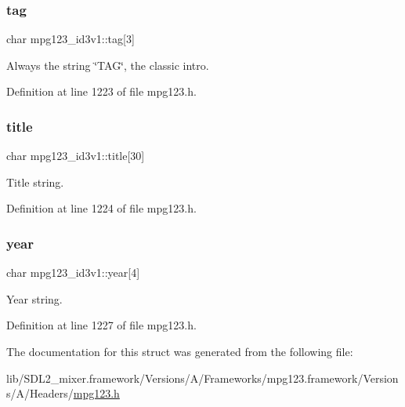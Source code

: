\subsubsection{\texorpdfstring{tag}{tag}}
{\footnotesize\ttfamily char mpg123\+\_\+id3v1\+::tag\mbox{[}3\mbox{]}}

Always the string \char`\"{}\+T\+A\+G\char`\"{}, the classic intro. 

Definition at line 1223 of file mpg123.\+h.

\mbox{\label{structmpg123__id3v1_a07f4a232c9be375fc35285538ff08c98}} 
\subsubsection{\texorpdfstring{title}{title}}
{\footnotesize\ttfamily char mpg123\+\_\+id3v1\+::title\mbox{[}30\mbox{]}}

Title string. 

Definition at line 1224 of file mpg123.\+h.

\mbox{\label{structmpg123__id3v1_a6087be9b3b25b86cafb4d59af51a1c67}} 
\subsubsection{\texorpdfstring{year}{year}}
{\footnotesize\ttfamily char mpg123\+\_\+id3v1\+::year\mbox{[}4\mbox{]}}

Year string. 

Definition at line 1227 of file mpg123.\+h.



The documentation for this struct was generated from the following file\+:\begin{DoxyCompactItemize}
\item 
lib/\+S\+D\+L2\+\_\+mixer.\+framework/\+Versions/\+A/\+Frameworks/mpg123.\+framework/\+Versions/\+A/\+Headers/\mbox{\hyperlink{mpg123_8h}{mpg123.\+h}}\end{DoxyCompactItemize}
